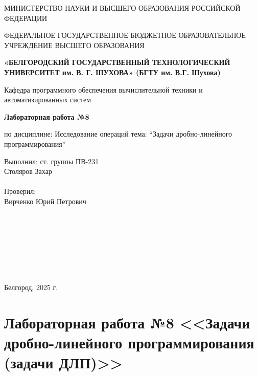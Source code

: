 \documentclass{report}
\newcommand{\q}[1]{``#1''}
\begin{document}
	\begin{titlepage}
		\begin{center}
			МИНИСТЕРСТВО НАУКИ И ВЫСШЕГО ОБРАЗОВАНИЯ\linebreak 
			РОССИЙСКОЙ ФЕДЕРАЦИИ\medskip
			
			ФЕДЕРАЛЬНОЕ ГОСУДАРСТВЕННОЕ БЮДЖЕТНОЕ ОБРАЗОВАТЕЛЬНОЕ 
			УЧРЕЖДЕНИЕ ВЫСШЕГО ОБРАЗОВАНИЯ\medskip
			
			\textbf{
				«БЕЛГОРОДСКИЙ ГОСУДАРСТВЕННЫЙ \linebreak
				ТЕХНОЛОГИЧЕСКИЙ УНИВЕРСИТЕТ им. В. Г. ШУХОВА»\linebreak
				(БГТУ им. В.Г. Шухова)
			}\bigskip
			
			Кафедра программного обеспечения вычислительной техники и автоматизированных систем
			\vspace{5cm}
			
			\Large\textbf{Лабораторная работа №8}
			
			\large по дисциплине: Исследование операций\linebreak
			тема: \q{Задачи дробно-линейного программирования}
		\end{center}\vspace{6cm}
		
		\begin{flushright}
			\begin{minipage}{7cm}
				Выполнил: ст. группы ПВ-231\\
				Столяров Захар\\
				\\
				Проверил: \\
				Вирченко Юрий Петрович\\
			\end{minipage}
		\end{flushright}\bigskip
		
		\
		
		\
		
		\
		
		\
		
		
		\begin{center}
			Белгород, 2025 г.
		\end{center}
	\end{titlepage}
	
	\newpage
	
	\setcounter{secnumdepth}{-1}
	\chapter{Лабораторная работа №8 <<Задачи дробно-линейного программирования (задачи ДЛП)>>}
	
\end{document}
